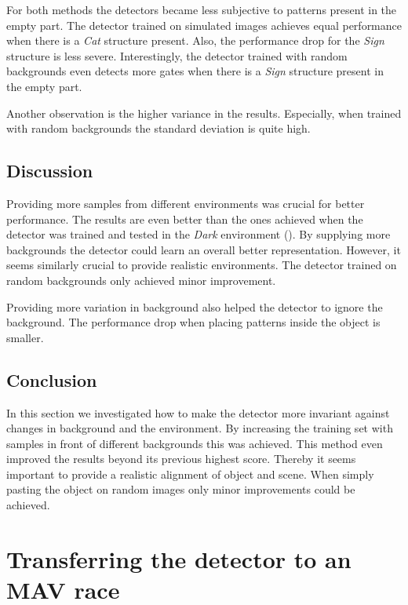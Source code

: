 For both methods the detectors became less subjective to patterns present in the empty part. The detector trained on simulated images achieves equal performance when there is a \textit{Cat} structure present. Also, the performance drop for the \textit{Sign} structure is less severe. Interestingly, the detector trained with random backgrounds even detects more gates when there is a \textit{Sign} structure present in the empty part.

Another observation is the higher variance in the results. Especially, when trained with random backgrounds the standard deviation is quite high. 


\subsection{Discussion}

Providing more samples from different environments was crucial for better performance. The results are even better than the ones achieved when the detector was trained and tested in the \textit{Dark} environment (). By supplying more backgrounds the detector could learn an overall better representation. However, it seems similarly crucial to provide realistic environments. The detector trained on random backgrounds only achieved minor improvement.

Providing more variation in background also helped the detector to ignore the background. The performance drop when placing patterns inside the object is smaller.

\subsection{Conclusion}

In this section we investigated how to make the detector more invariant against changes in background and the environment. By increasing the training set with samples in front of different backgrounds this was achieved. This method even improved the results beyond its previous highest score. Thereby it seems important to provide a realistic alignment of object and scene. When simply pasting the object on random images only minor improvements could be achieved.

\section{Transferring the detector to an \ac{MAV} race}

